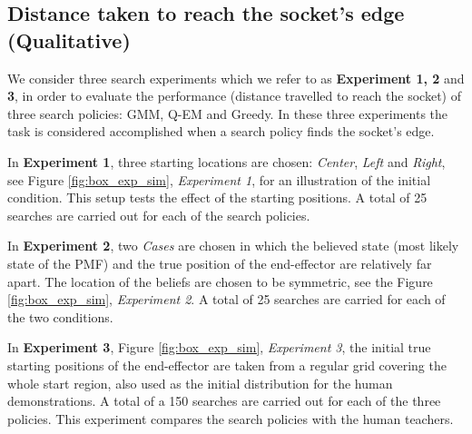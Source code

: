 \subsection{Distance taken to reach the socket's edge (Qualitative)}

We consider three search experiments which we refer to as \textbf{Experiment 1, 2} and \textbf{3},
in order to evaluate the performance (distance travelled to reach the socket) of three search policies: GMM, Q-EM and Greedy.
In these three experiments the task is considered accomplished when a search policy finds the socket's edge. 

In \textbf{Experiment 1}, three starting locations are chosen: \textit{Center}, \textit{Left} and \textit{Right}, 
see Figure \ref{fig:box_exp_sim}, \textit{Experiment 1}, for an illustration of the initial condition. 
This setup tests the effect of the starting positions. A total of 25 searches are carried out for each of the search policies.

In \textbf{Experiment 2}, two \textit{Cases} are chosen in which the believed state (most likely state of the PMF) and the true position
of the end-effector are relatively far apart. The location of the beliefs are chosen to be symmetric, see the Figure \ref{fig:box_exp_sim}, 
\textit{Experiment 2}. A total of 25 searches are carried for each of the two conditions.

In \textbf{Experiment 3}, Figure \ref{fig:box_exp_sim}, \textit{Experiment 3}, the initial true starting positions 
of the end-effector are taken from a regular grid covering the whole start region, also used as the initial distribution for 
the human demonstrations. A total of a 150 searches are carried out for each of the three policies. 
This experiment compares the search policies with the human teachers.

